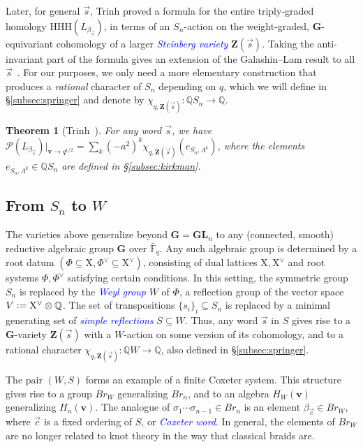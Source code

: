 \documentclass[submission]{FPSAC2025}
\newtheorem{thm}{Theorem}
\newcommand{\dfemph}[1]{\textcolor{blue}{\emph{#1}}}
\newcommand{\x}{\mathbf{v}}
\newcommand{\Br}{\mathit{Br}}
\newcommand{\HOMFLYPT}{\mathcal{P}}
\newcommand{\HHH}{\mathrm{HHH}}
\newcommand{\CharQ}[1]{\chi_{q, #1}}
\begin{document}
Later, for general $\vec{s}$, Trinh proved a formula for the entire triply-graded homology $\HHH(L_{\beta_{\vec{s}}})$, in terms of an $S_n$-action on the weight-graded, $\mathbf{G}$-equivariant cohomology of a larger \dfemph{Steinberg variety} $\mathbf{Z}(\vec{s})$.
Taking the anti-invariant part of the formula gives an extension of the Galashin--Lam result to all $\vec{s}$~\cite{trinh_21}.
For our purposes, we only need a more elementary construction that produces a \emph{rational} character of $S_n$ depending on $q$, which we will define in \S\ref{subsec:springer} and denote by $\CharQ{\mathbf{Z}(\vec{s})} : \mathbb{Q}S_n \to \mathbb{Q}$.

\begin{thm}[Trinh~\cite{trinh_21}]\label{thm:trinh-homflypt}
For any word $\vec{s}$, we have $\HOMFLYPT(L_{\beta_{\vec{s}}})|_{\x \to q^{1/2}} = \sum_k {(-a^2)^k}\CharQ{\mathbf{Z}(\vec{s})}(e_{S_n, \Lambda^k})$, where the elements $e_{S_n, \Lambda^k} \in \mathbb{Q}S_n$ are defined in \S\ref{subsec:kirkman}.
\end{thm}

\subsection{From $S_n$ to $W$}\label{subsec:weyl}

The varieties above generalize beyond $\mathbf{G} = \mathbf{GL}_n$ to any (connected, smooth) reductive algebraic group $\mathbf{G}$ over $\bar{\mathbb{F}}_q$.
Any such algebraic group is determined by a root datum $(\Phi \subseteq \mathrm{X}, \Phi^\vee \subseteq \mathrm{X}^\vee)$, consisting of dual lattices $\mathrm{X}, \mathrm{X}^\vee$ and root systems $\Phi, \Phi^\vee$ satisfying certain conditions.
In this setting, the symmetric group $S_n$ is replaced by the \dfemph{Weyl group} $W$ of $\Phi$, a reflection group of the vector space $V \vcentcolon= \mathrm{X}^\vee \otimes \mathbb{Q}$.
The set of transpositions $\{s_i\}_i \subseteq S_n$ is replaced by a minimal generating set of \dfemph{simple reflections} $S \subseteq W$.
Thus, any word $\vec{s}$ in $S$ gives rise to a $\mathbf{G}$-variety $\mathbf{Z}(\vec{s})$ with a $W$-action on some version of its cohomology, and to a rational character $\CharQ{\mathbf{Z}(\vec{s})} : \mathbb{Q}W \to \mathbb{Q}$, also defined in \S\ref{subsec:springer}.

The pair $(W, S)$ forms an example of a finite Coxeter system.
This structure gives rise to a group $\Br_W$ generalizing $\Br_n$, and to an algebra $H_W(\x)$ generalizing $H_n(\x)$.
The analogue of $\sigma_1 \cdots \sigma_{n - 1} \in \Br_n$ is an element $\beta_{\vec{c}} \in \Br_W$, where $\vec{c}$ is a fixed ordering of $S$, or \dfemph{Coxeter word}.
In general, the elements of $\Br_W$ are no longer related to knot theory in the way that classical braids are.
\end{document}
